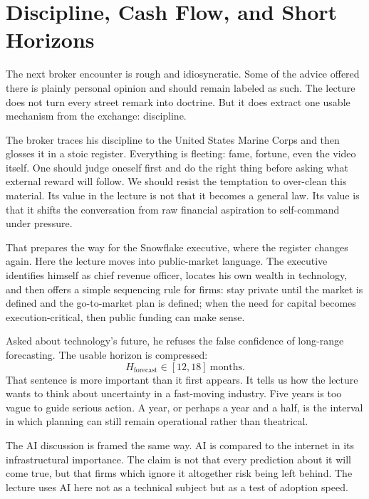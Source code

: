 \section{Discipline, Cash Flow, and Short Horizons}

The next broker encounter is rough and idiosyncratic. Some of the advice offered there is plainly personal opinion and should remain labeled as such. The lecture does not turn every street remark into doctrine. But it does extract one usable mechanism from the exchange: discipline.

The broker traces his discipline to the United States Marine Corps and then glosses it in a stoic register. Everything is fleeting: fame, fortune, even the video itself. One should judge oneself first and do the right thing before asking what external reward will follow. We should resist the temptation to over-clean this material. Its value in the lecture is not that it becomes a general law. Its value is that it shifts the conversation from raw financial aspiration to self-command under pressure.

That prepares the way for the Snowflake executive, where the register changes again. Here the lecture moves into public-market language. The executive identifies himself as chief revenue officer, locates his own wealth in technology, and then offers a simple sequencing rule for firms: stay private until the market is defined and the go-to-market plan is defined; when the need for capital becomes execution-critical, then public funding can make sense.

Asked about technology's future, he refuses the false confidence of long-range forecasting. The usable horizon is compressed:
\begin{equation}
H_{\mathrm{forecast}} \in [12,18]\ \mathrm{months}.
\end{equation}
That sentence is more important than it first appears. It tells us how the lecture wants to think about uncertainty in a fast-moving industry. Five years is too vague to guide serious action. A year, or perhaps a year and a half, is the interval in which planning can still remain operational rather than theatrical.

The AI discussion is framed the same way. AI is compared to the internet in its infrastructural importance. The claim is not that every prediction about it will come true, but that firms which ignore it altogether risk being left behind. The lecture uses AI here not as a technical subject but as a test of adoption speed.

